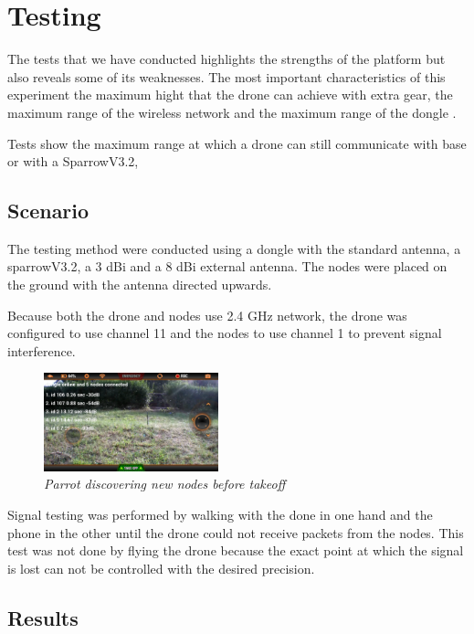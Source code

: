 \normalfont\normalsize
\chapter{Testing}

The tests that we have conducted highlights the strengths of the platform but also reveals some of its weaknesses.
The most important characteristics of this experiment the maximum hight that the drone  can achieve with extra gear, the maximum range of the wireless network and the maximum range of the dongle .

Tests show the maximum range at which a drone can still communicate with base or with a SparrowV3.2,


\section{Scenario}

The testing method were conducted using a dongle with the standard antenna, a sparrowV3.2, a 3 dBi and a 8 dBi external antenna. The nodes were placed on the ground with the antenna directed upwards.

Because both the drone and nodes use 2.4 GHz network, the drone was configured to use channel 11 and the nodes to use channel 1 to prevent signal interference.

\begin{figure}[ht]
\begin{center}
\includegraphics[width=0.45\textwidth]{img/parrot_test.png}
\end{center}
\caption{\small \itshape{Parrot discovering new nodes before takeoff}}
\end{figure}

Signal testing was performed by walking with the done in one hand and the phone in the other until the drone could not receive packets from the nodes. This test was not done by flying the drone because the exact point at which the signal is lost can not be controlled with the desired precision.



\section{Results}


